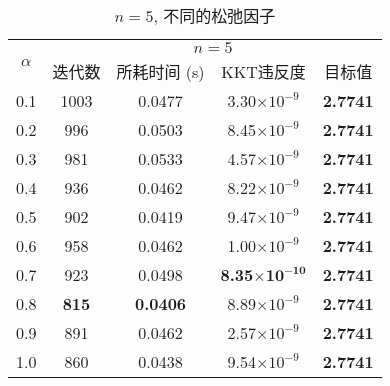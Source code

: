 \begin{table}[htbp]
	\renewcommand{\captionfont}{\small}
    \centering
    \caption{$n=5$, 不同的松弛因子}
    \label{n5alpha}
    \vskip 4mm
    \begin{tabular}{c|c|c|c|c}
        \hline
        \multirow{2}{*}{$\alpha$} & \multicolumn{4}{c}{$n=5$}\\\cline{2-5}
          & 迭代数 & 所耗时间 (s) & KKT违反度 & 目标值\\\hline
        0.1 & 1003 & 0.0477 & 3.30$\times10^{-9}$ &\textbf{2.7741} \\\hline
        0.2 & 996 & 0.0503 & 8.45$\times10^{-9}$ & \textbf{2.7741} \\\hline
        0.3 & 981 & 0.0533 & 4.57$\times10^{-9}$ & \textbf{2.7741} \\\hline
        0.4 & 936 & 0.0462 & 8.22$\times10^{-9}$ & \textbf{2.7741} \\\hline
        0.5 & 902 & 0.0419 & 9.47$\times10^{-9}$ & \textbf{2.7741} \\\hline
        0.6 & 958 & 0.0462 & 1.00$\times10^{-9}$ & \textbf{2.7741} \\\hline
        0.7 & 923 & 0.0498 & \textbf{8.35$\mathbf{\times10^{-10}}$} & \textbf{2.7741} \\\hline
        0.8 & \textbf{815} & \textbf{0.0406} & 8.89$\times10^{-9}$ & \textbf{2.7741} \\\hline
        0.9 & 891 & 0.0462 & 2.57$\times10^{-9}$ & \textbf{2.7741} \\\hline
        1.0 & 860 & 0.0438 & 9.54$\times10^{-9}$ & \textbf{2.7741} \\\hline
    \end{tabular}
\end{table}

